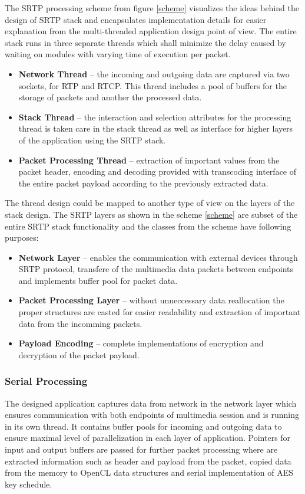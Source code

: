 The SRTP processing scheme from figure \ref{scheme} visualizes the ideas behind
the design of SRTP stack and encapsulates implementation details for easier
explanation from the multi-threaded application design point of view. 
The entire stack runs in three separate threads which shall minimize the delay 
caused by waiting on modules with varying time of execution per packet.
\begin{itemize}
\item \textbf{Network Thread} -- the incoming and outgoing data are captured
via two sockets, for RTP and RTCP. This thread includes a pool of buffers for
the storage of packets and another the processed data.
\item \textbf{Stack Thread} -- the interaction and selection attributes for
the processing thread is taken care in the stack thread as well as interface
for higher layers of the application using the SRTP stack.
\item \textbf{Packet Processing Thread} -- extraction of important values from
the packet header, encoding and decoding provided with transcoding interface of 
the entire packet payload according to the previously extracted data.
\end{itemize} 

The thread design could be mapped to another type of view on the layers of
the stack design. The SRTP layers as shown in the scheme \ref{scheme} are subset
of the entire SRTP stack functionality and the classes from the scheme have 
following purposes:

\begin{itemize}
\item \textbf{Network Layer} -- enables the communication with external devices
through SRTP protocol, transfere of the multimedia data packets between endpoints
and implements buffer pool for packet data.  
\item \textbf{Packet Processing Layer} -- without unneccessary data reallocation
the proper structures are casted for easier readability and extraction of important
data from the incomming packets. 
\item \textbf{Payload Encoding} -- complete implementations of encryption and 
decryption of the packet payload.
\end{itemize}

\subsubsection*{Serial Processing}
The designed application captures data from network in the network layer which
ensures communication with both endpoints of multimedia session and is running 
in its own thread. It contains buffer pools for incoming and outgoing data to 
ensure maximal level of parallelization in each layer of application. Pointers 
for input and output buffers are passed for further packet processing where are 
extracted information such as header and payload from the packet, copied data 
from the memory to OpenCL data structures and serial implementation of AES key 
schedule. 

